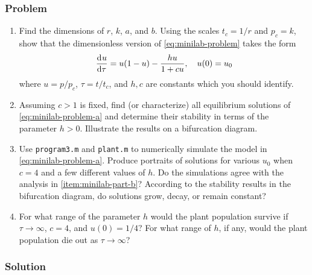 \documentclass[12pt]{article}
\begin{document}
\subsubsection*{Problem}
\begin{enumerate}
\item Find the dimensions of $r$, $k$, $a$, and $b$. Using the scales $t_c =
  1/r$ and $p_c = k$, show that the dimensionless version of
  \cref{eq:minilab-problem} takes the form
  \begin{equation}
    \label{eq:minilab-problem-a}
    \frac{\mathrm{d}^{} {u}}{\mathrm{d}{\tau}^{}}=u(1-u)-\frac{hu}{1+cu},\quad u(0)=u_0
  \end{equation}
  where $u=p/p_c$, $\tau=t/t_c$, and $h,c$ are constants which you should
  identify.
\item Assuming $c>1$ is fixed, find (or characterize) all equilibrium solutions
  of \cref{eq:minilab-problem-a} and determine their stability in terms of the
  parameter $h>0$. Illustrate the results on a bifurcation diagram.
\label{item:minilab-part-b}
\item Use \verb|program3.m| and \verb|plant.m| to numerically simulate the model
  in \cref{eq:minilab-problem-a}. Produce portraits of solutions for various
  $u_0$ when $c=4$ and a few different values of $h$. Do the simulations agree
  with the analysis in \cref{item:minilab-part-b}? According to the stability
  results in the bifurcation diagram, do solutions grow, decay, or remain
  constant?
\item For what range of the parameter $h$ would the plant population survive if
  $\tau\rightarrow\infty$, $c=4$, and $u(0)=1/4$? For what range of $h$, if any,
  would the plant population die out as $\tau\rightarrow\infty$?
\end{enumerate}

\subsubsection*{Solution}
\todo[]
\end{document}
